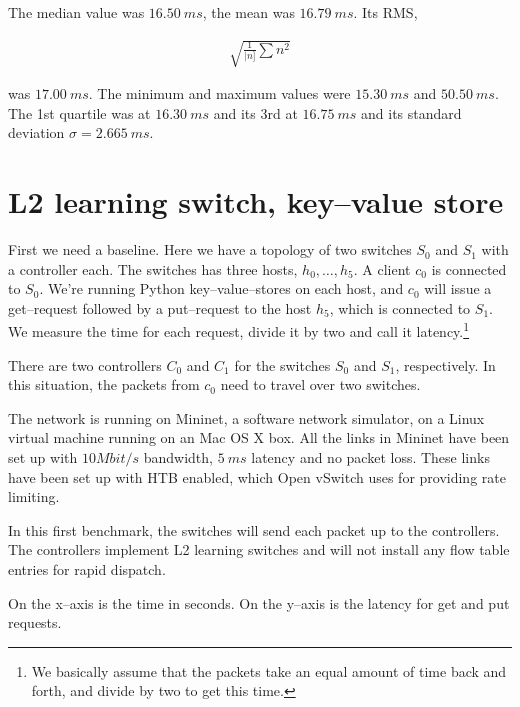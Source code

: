 The median value was $16.50~ms$, the mean was $16.79~ms$.
Its \ac{RMS},

\begin{gather}
  \sqrt{\frac{1}{|n]}\sum{n^2}}
  \label{equation:rms}
\end{gather}

was $17.00~ms$.
The minimum and maximum values were $15.30~ms$ and $50.50~ms$.
The 1st quartile was at $16.30~ms$ and its 3rd at $16.75~ms$ and its standard
deviation $\sigma = 2.665~ms$.


\section{L2 learning switch, key--value store}
\label{chapter:benchmark.l2.kv.noflows}

First we need a baseline.  Here we have a topology of two switches $S_0$ and
$S_1$ with a controller each.  The switches has three hosts, $h_0, \dots, h_5$.
A client $c_0$ is connected to $S_0$. We're running Python
key--value--stores on each host, and $c_0$ will issue a get--request
followed by a put--request to the host $h_5$, which is connected to $S_1$.
We measure the time for each request, divide it
by two and call it latency.\footnote{We basically assume that the packets
take an equal amount of time back and forth, and divide by two to get this
time.}

There are two controllers $C_0$ and $C_1$ for the switches $S_0$ and $S_1$,
respectively.  In this situation, the packets from $c_0$ need to travel
over two switches.

The network is running on Mininet, a software network simulator, on a Linux
virtual machine running on an Mac OS X box.  All the links in Mininet have
been set up with $10 Mbit/s$ bandwidth, $5~ms$ latency and no packet
loss.  These links have been set up with \ac{HTB}
\cite{devera2002hierarchical} enabled, which Open vSwitch uses for providing
rate limiting.

In this first benchmark, the switches will send each packet up to the
controllers.  The controllers implement L2 learning switches and will not
install any flow table entries for rapid dispatch.

On the x--axis is the time in seconds.  On the y--axis is the latency for
get and put requests.

